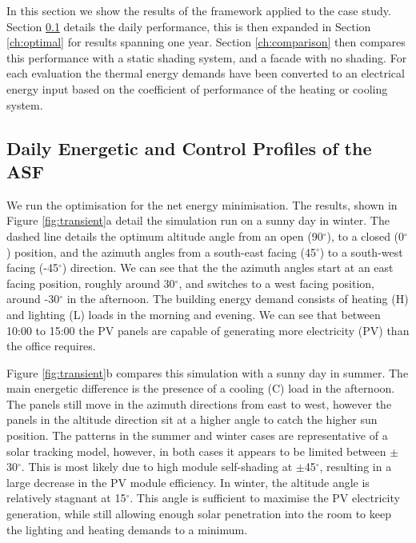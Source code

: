 


In this section we show the results of the framework applied to the case study. Section \ref{ch:transient} details the daily performance, this is then expanded in Section \ref{ch:optimal} for results spanning one year. Section \ref{ch:comparison} then compares this performance with a static shading system, and a facade with no shading. For each evaluation the thermal energy demands have been converted to an electrical energy input based on the coefficient of performance of the heating or cooling system.

\subsection{Daily Energetic and Control Profiles of the ASF}
\label{ch:transient}
We run the optimisation for the net energy minimisation. The results, shown in Figure \ref{fig:transient}a detail the simulation run on a sunny day in winter. The dashed line details the optimum altitude angle from an open (90$^{\circ}$), to a closed (0$^{\circ}$) position, and the azimuth angles from a south-east facing (45$^{\circ}$) to a south-west facing (-45$^{\circ}$) direction. We can see that the the azimuth angles start at an east facing position, roughly around 30$^{\circ}$, and switches to a west facing position, around -30$^{\circ}$ in the afternoon. The building energy demand consists of heating (H) and lighting (L) loads in the morning and evening. We can see that between 10:00 to 15:00 the PV panels are capable of generating more electricity (PV) than the office requires. 

Figure \ref{fig:transient}b compares this simulation with a sunny day in summer. The main energetic difference is the presence of a cooling (C) load in the afternoon. The panels still move in the azimuth directions from east to west, however the panels in the altitude direction sit at a higher angle to catch the higher sun position. The patterns in the summer and winter cases are representative of a solar tracking model, however, in both cases it appears to be limited between $\pm$30$^{\circ}$. This is most likely due to high module self-shading at $\pm$45$^{\circ}$, resulting in a large decrease in the PV module efficiency. In winter, the altitude angle is relatively stagnant at 15$^{\circ}$. This angle is sufficient to maximise the PV electricity generation, while still allowing enough solar penetration into the room to keep the lighting and heating demands to a minimum. 

